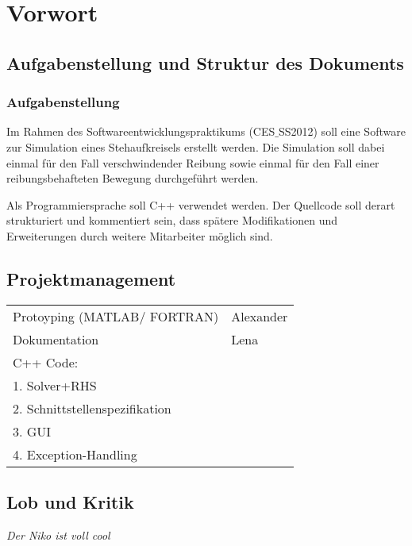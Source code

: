 \chapter{Vorwort}
\label{ch:1}

\section{Aufgabenstellung und Struktur des Dokuments}
\label{sec:1.1}

\subsection*{Aufgabenstellung}

{Im Rahmen des Softwareentwicklungspraktikums (CES$\_$SS2012) soll eine Software zur Simulation eines Stehaufkreisels erstellt werden.
Die Simulation soll dabei einmal f\"ur den Fall verschwindender
Reibung sowie einmal für den Fall einer reibungsbehafteten Bewegung durchgef\"uhrt werden. 

Als Programmiersprache soll C++ verwendet werden. Der Quellcode soll derart strukturiert
und kommentiert sein, dass sp\"atere Modifikationen und Erweiterungen durch weitere
Mitarbeiter m\"oglich sind.}

\section{Projektmanagement}
\label{sec:1.2}

{\em 
\begin{tabular}{l l}
	Protoyping (MATLAB/ FORTRAN)& Alexander \\
	Dokumentation &Lena \\
	C++ Code:& \\
	1. Solver+RHS& \\
	2. Schnittstellenspezifikation & \\
	3. GUI & \\
	4. Exception-Handling & \\
\end{tabular}
}

\section{Lob und Kritik}
\label{sec:1.3}

{\em Der Niko ist voll cool}

